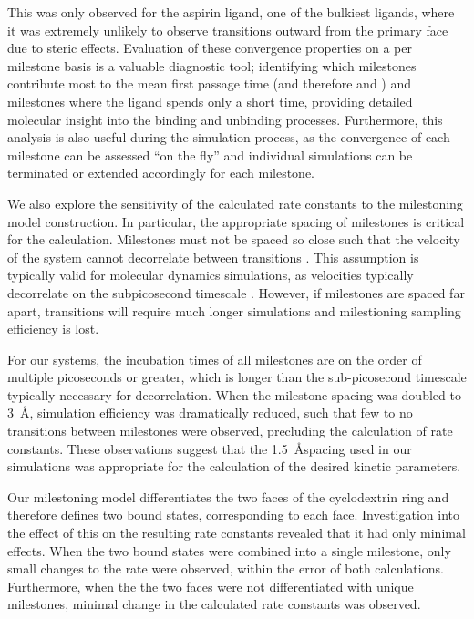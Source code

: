 

This was only observed for the aspirin ligand, one of the bulkiest ligands, where it was extremely unlikely to observe transitions outward from the primary face due to steric effects. 
Evaluation of these convergence properties on a 
per milestone basis is a valuable diagnostic tool; identifying which 
milestones contribute most to the mean first passage time (and therefore \kon 
and \koff) and milestones where the ligand spends only a short time, providing 
detailed molecular insight into the binding and unbinding processes.
Furthermore, this analysis is also useful during the simulation process, 
as the convergence of each milestone can be assessed ``on the fly'' and individual simulations 
can be terminated or extended accordingly for each milestone.



\par We also explore the sensitivity of the calculated rate constants to the milestoning model construction. In particular, the appropriate 
spacing of milestones is critical for the calculation. Milestones must not be 
spaced so close such that the velocity of the system cannot decorrelate between 
transitions \cite{Vanden-Eijnden2008,West2007}. This assumption is typically 
valid for molecular dynamics simulations, as velocities typically decorrelate on 
the subpicosecond timescale \cite{Vanden-Eijnden2008}. However, if milestones are 
spaced far apart, transitions will require much longer simulations and 
milestioning sampling efficiency is lost.

For our systems, the incubation times of all milestones are on the order 
of multiple picoseconds or greater, which 
is longer than the sub-picosecond timescale typically necessary for decorrelation\cite{Vanden-Eijnden2008}.
When the milestone spacing was doubled to 3~\AA, simulation efficiency was 
dramatically reduced, such that few to no transitions between milestones were 
observed, precluding the calculation of rate constants. These observations suggest 
that the 1.5~\AA spacing used in our simulations was appropriate for the 
calculation of the desired kinetic parameters.

\par Our milestoning model differentiates the two faces 
of the cyclodextrin ring and therefore defines two bound states, corresponding 
to each face. Investigation into the effect of this on the resulting rate 
constants revealed that it had only minimal effects. When the two bound states 
were combined into a single milestone, only small changes to the rate were 
observed, within the error of both calculations. Furthermore, when the the two 
faces were not differentiated with unique milestones, minimal change in the 
calculated rate constants was observed. 

